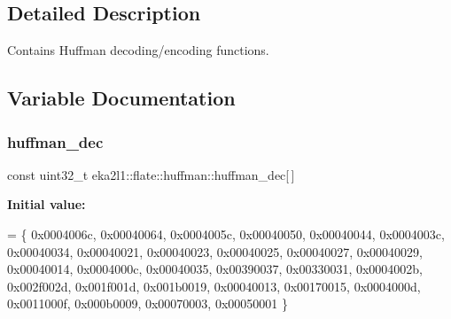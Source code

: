 \subsection{Detailed Description}
Contains Huffman decoding/encoding functions. 

\subsection{Variable Documentation}
\mbox{\label{namespaceeka2l1_1_1flate_1_1huffman_a58d7e346ec58dc85ca33f82010b80b44}} 
\subsubsection{\texorpdfstring{huffman\+\_\+dec}{huffman\_dec}}
{\footnotesize\ttfamily const uint32\+\_\+t eka2l1\+::flate\+::huffman\+::huffman\+\_\+dec\mbox{[}$\,$\mbox{]}}

{\bfseries Initial value\+:}
\begin{DoxyCode}
= \{
                0x0004006c,
                0x00040064,
                0x0004005c,
                0x00040050,
                0x00040044,
                0x0004003c,
                0x00040034,
                0x00040021,
                0x00040023,
                0x00040025,
                0x00040027,
                0x00040029,
                0x00040014,
                0x0004000c,
                0x00040035,
                0x00390037,
                0x00330031,
                0x0004002b,
                0x002f002d,
                0x001f001d,
                0x001b0019,
                0x00040013,
                0x00170015,
                0x0004000d,
                0x0011000f,
                0x000b0009,
                0x00070003,
                0x00050001
            \}
\end{DoxyCode}
